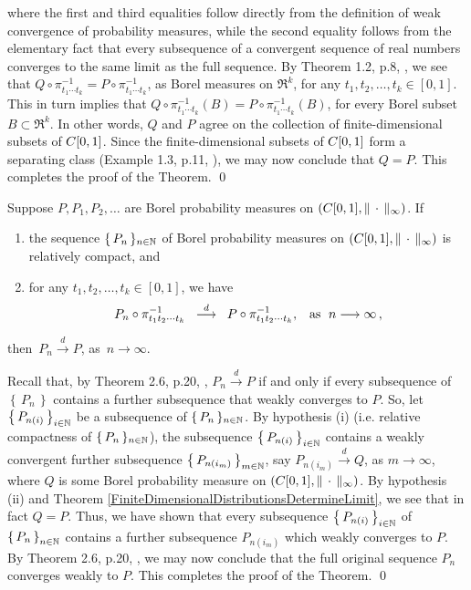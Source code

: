 where the first and third equalities follow directly from the definition of weak convergence of probability
measures, while the second equality follows from the elementary fact that every subsequence of a
convergent sequence of real numbers converges to the same limit as the full sequence.
By Theorem 1.2, p.8, \cite{Billingsley1999}, we see that
$Q\circ\pi_{t_{1}\cdots t_{k}}^{-1} = P\circ\pi_{t_{1}\cdots t_{k}}^{-1}$,
as Borel measures on $\Re^{k}$, for any $t_{1}, t_{2}, \ldots, t_{k} \in [0,1]$.
This in turn implies that $Q\circ\pi_{t_{1}\cdots t_{k}}^{-1}(B) = P\circ\pi_{t_{1}\cdots t_{k}}^{-1}(B)$,
for every Borel subset $B \subset \Re^{k}$.
In other words, $Q$ and $P$ agree on the collection of finite-dimensional subsets of $C[0,1]$.
Since the finite-dimensional subsets of $C[0,1]$ form a separating class
(Example 1.3, p.11, \cite{Billingsley1999}), we may now conclude that $Q = P$.
This completes the proof of the Theorem.
\qed

\begin{theorem}
\mbox{}\vskip 0.1cm
\noindent
Suppose $P, P_{1}, P_{2}, \ldots $ are Borel probability measures on $\left(C[0,1],\Vert\,\cdot\,\Vert_{\infty}\right)$.
If
\begin{enumerate}
\item	the sequence $\{\,P_{n}\,\}_{n\in\mathbb{N}}$ of Borel probability measures
		on $\left(C[0,1],\Vert\,\cdot\,\Vert_{\infty}\right)$ is relatively compact, and
\item	for any $t_{1}, t_{2}, \ldots, t_{k} \in [0,1]$, we have
		\begin{equation*}
		P_{n}\circ\pi_{t_{1}t_{2}\cdots t_{k}}^{-1}
		\;\;\overset{d}{\longrightarrow}\;\;
		P\circ\pi_{t_{1}t_{2}\cdots t_{k}}^{-1},
		\;\;\;
		\textnormal{as \;$n \longrightarrow \infty$}\,,
		\end{equation*}
\end{enumerate}
then \,$P_{n} \overset{d}{\longrightarrow} P$, as \,$n \longrightarrow \infty$.
\end{theorem}
\proof
Recall that, by Theorem 2.6, p.20, \cite{Billingsley1999}, $P_{n} \overset{d}{\longrightarrow} P$ if and only if
every subsequence of $\left\{\,P_{n}\,\right\}$ contains a further subsequence that weakly converges to $P$.
So, let $\left\{\,P_{n(i)}\,\right\}_{i\in\mathbb{N}}$ be a subsequence of $\{\,P_{n}\,\}_{n\in\mathbb{N}}$.
By hypothesis (i) (i.e. relative compactness of $\{\,P_{n}\,\}_{n\in\mathbb{N}}$), the subsequence
$\left\{\,P_{n(i)}\,\right\}_{i\in\mathbb{N}}$ contains a weakly convergent further subsequence
$\left\{\,P_{n(i_{m})}\,\right\}_{m\in\mathbb{N}}$,
say $P_{n(i_{m})} \overset{d}{\longrightarrow} Q$, as $m \longrightarrow \infty$,
where $Q$ is some Borel probability measure on $\left(C[0,1],\Vert\,\cdot\,\Vert_{\infty}\right)$.
By hypothesis (ii) and Theorem \ref{FiniteDimensionalDistributionsDetermineLimit},
we see that in fact $Q = P$.
Thus, we have shown that every subsequence $\left\{\,P_{n(i)}\,\right\}_{i\in\mathbb{N}}$ of
$\left\{\,P_{n}\,\right\}_{n\in\mathbb{N}}$ contains a further subsequence $P_{n(i_{m})}$
which weakly converges to $P$.
By Theorem 2.6, p.20, \cite{Billingsley1999}, we may now conclude that the full original
sequence $P_{n}$ converges weakly to $P$. This completes the proof of the Theorem.
\qed

